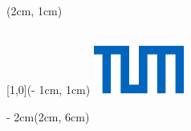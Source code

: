 \begin{titlepage}

\begin{textblock*}{\textwidth}(2cm, 1cm)%
    	\setlength{\baselineskip}{11pt}%
        \textcolor{UniversitaetFarbe} { %
        \fontsize{9}{11}\selectfont%
        \sffamily \Lehrstuhl\\%
        \sffamily \Fakultaet\\%
        \sffamily \Uni }
\end{textblock*}%

\begin{textblock*}{\UniversitaetLogoBreite}[1,0](\paperwidth - 1cm, 1cm)%
        \includegraphics{images/TUM_Logos/TUM_blau.pdf}%
\end{textblock*}%

\begin{textblock*}{\textwidth - 2cm}(2cm, 6cm)%
{\sffamily \Large \ArtDerArbeit}\\
{\sffamily \huge \TitelArbeit \par} %
~\\
\sffamily \Large \textbf{\DeinName}\\
\end{textblock*}

~\\ %
\end{titlepage}